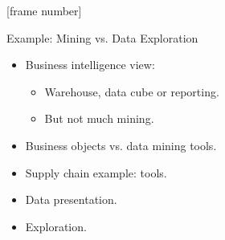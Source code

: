\documentclass[aspectratio=169,t]{beamer}
\begin{document}
  {
    [frame number]
    \begin{frame}{Example: Mining vs. Data Exploration}
    \begin{itemize}
        \item Business intelligence view:
        \begin{itemize}
            \item Warehouse, data cube or reporting.
            \item But not much mining.
        \end{itemize}
        \item Business objects vs. data mining tools.
        \item Supply chain example: tools.
        \item Data presentation.
        \item Exploration.
    \end{itemize}
    \end{frame}
  }
\end{document}
